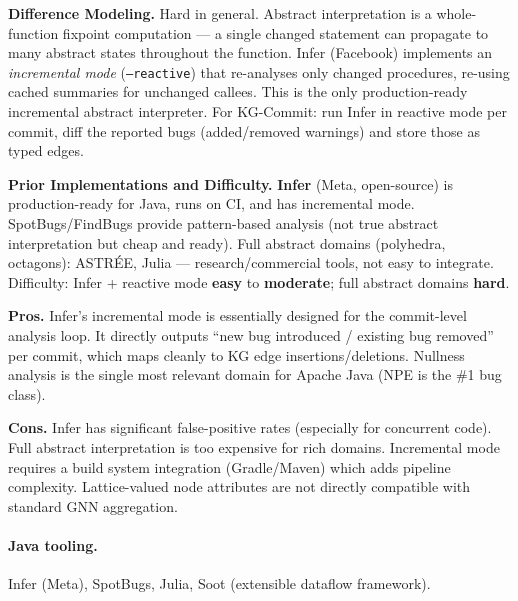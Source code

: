 \documentclass[12pt,a4paper]{article}
\begin{document}
\begin{diffbox}
\textbf{Difference Modeling.}
Hard in general. Abstract interpretation is a whole-function fixpoint
computation --- a single changed statement can propagate to many abstract states
throughout the function. Infer (Facebook) implements an \emph{incremental mode}
(\texttt{--reactive}) that re-analyses only changed procedures, re-using cached
summaries for unchanged callees. This is the only production-ready incremental
abstract interpreter. For KG-Commit: run Infer in reactive mode per commit,
diff the reported bugs (added/removed warnings) and store those as typed edges.
\end{diffbox}

\begin{implbox}
\textbf{Prior Implementations and Difficulty.}
\textbf{Infer} (Meta, open-source) is production-ready for Java, runs on CI,
and has incremental mode. SpotBugs/FindBugs provide pattern-based analysis
(not true abstract interpretation but cheap and ready). Full abstract domains
(polyhedra, octagons): ASTR\'{E}E, Julia --- research/commercial tools, not
easy to integrate. Difficulty: Infer + reactive mode \textbf{easy} to
\textbf{moderate}; full abstract domains \textbf{hard}.
\end{implbox}

\begin{prosbox}
\textbf{Pros.}
Infer's incremental mode is essentially designed for the commit-level analysis
loop. It directly outputs ``new bug introduced / existing bug removed'' per
commit, which maps cleanly to KG edge insertions/deletions. Nullness analysis
is the single most relevant domain for Apache Java (NPE is the \#1 bug class).
\end{prosbox}

\begin{consbox}
\textbf{Cons.}
Infer has significant false-positive rates (especially for concurrent code).
Full abstract interpretation is too expensive for rich domains. Incremental
mode requires a build system integration (Gradle/Maven) which adds pipeline
complexity. Lattice-valued node attributes are not directly compatible with
standard GNN aggregation.
\end{consbox}

\paragraph{Java tooling.} Infer (Meta), SpotBugs, Julia, Soot (extensible
dataflow framework).
\end{document}
